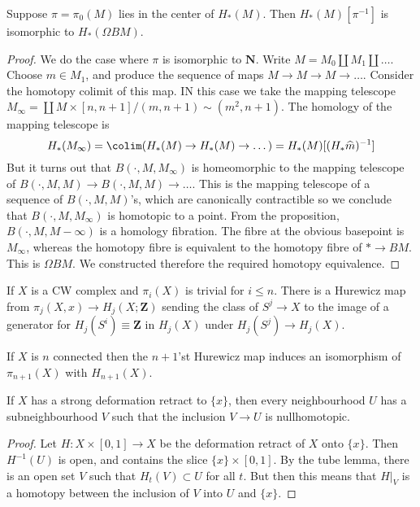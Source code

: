 \begin{theorem}
    Suppose $\pi = \pi_0(M)$ lies in the center of $H_*(M)$. Then $H_*(M)[\pi^{-1}]$ is isomorphic to $H_*(\Omega BM)$.
\end{theorem}
\begin{proof}
    We do the case where $\pi$ is isomorphic to $\mathbf{N}$. Write $M = M_0 \coprod M_1 \coprod \dots$. Choose $m \in M_1$, and produce the sequence of maps $M \to M \to M \to \dots$. Consider the homotopy colimit of this map. IN this case we take the mapping telescope $M_\infty = \coprod M \times [n,n+1]/ (m,n+1) \sim (m^2,n+1)$. The homology of the mapping telescope is
    \[ H_*(M_\infty) = \colim ( H_*(M) \to H_*(M) \to \dots ) = H_*(M)[(H_* \widehat{m})^{-1}] \] 
    But it turns out that $B(\cdot,M,M_\infty)$ is homeomorphic to the mapping telescope of $B(\cdot,M,M) \to B(\cdot,M,M) \to \dots$. This is the mapping telescope of a sequence of $B(\cdot,M,M)$'s, which are canonically contractible so we conclude that $B(\cdot,M,M_\infty)$ is homotopic to a point. From the proposition, $B(\cdot,M,M-\infty)$ is a homology fibration. The fibre at the obvious basepoint is $M_\infty$, whereas the homotopy fibre is equivalent to the homotopy fibre of $* \to BM$. This is $\Omega BM$. We constructed therefore the required homotopy equivalence.
\end{proof}

\begin{theorem}[Hurewicz]
    If $X$ is a CW complex and $\pi_i(X)$ is trivial for $i \leq n$. There is a Hurewicz map from $\pi_j(X,x) \to H_j(X;\mathbf{Z})$ sending the class of $S^j \to X$ to the image of a generator for $H_j(S^i) \equiv \mathbf{Z}$ in $H_j(X)$ under $H_j(S^j) \to H_j(X)$.
\end{theorem}

If $X$ is $n$ connected then the $n+1$'st Hurewicz map induces an isomorphism of $\pi_{n+1}(X)$ with $H_{n+1}(X)$.











\begin{theorem}
    If $X$ has a strong deformation retract to $\{ x \}$, then every neighbourhood $U$ has a subneighbourhood $V$ such that the inclusion $V \to U$ is nullhomotopic.
\end{theorem}
\begin{proof}
    Let $H: X \times [0,1] \to X$ be the deformation retract of $X$ onto $\{ x \}$. Then $H^{-1}(U)$ is open, and contains the slice $\{ x \} \times [0,1]$. By the tube lemma, there is an open set $V$ such that $H_t(V) \subset U$ for all $t$. But then this means that $H|_V$ is a homotopy between the inclusion of $V$ into $U$ and $\{ x \}$.
\end{proof}


